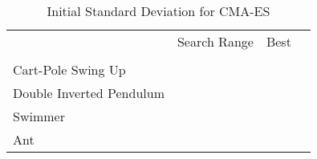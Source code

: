 \documentclass{article}
\begin{document}
\begin{table}[!t]
\centering
\caption{Initial Standard Deviation for CMA-ES}
\label{hyper_cma_es}
\begin{tabular}{l|lll}
\cline{1-4} \\ [-8pt]
 & Search Range              & Best                 &  \\ [2pt] \cline{1-4} \\ [-8pt]
Cart-Pole Swing Up     &             &                &  \\
Double Inverted Pendulum     &      &                &  \\
Swimmer               &             &                &  \\
Ant                   &                &                &  \\ [2pt] \cline{1-4}
\end{tabular}
\end{table}
\clearpage{}
\end{document}
